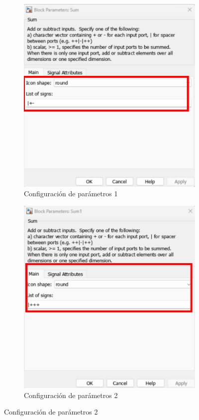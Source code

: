\begin{figure}[htbp]
\begin{subfigure}[b]{0.45\textwidth}
        \includegraphics[width=\textwidth]{fig/Capitulo5/Caso_de_estudio_PID/config_sum_02.pdf}
        \caption{Configuración de parámetros 1}
        \label{fig:parametros_add_01}
    \end{subfigure}
    \hfill
    \begin{subfigure}[b]{0.45\textwidth}
        \centering
        \includegraphics[width=\textwidth]{fig/Capitulo5/Caso_de_estudio_PID/config_sum_01.pdf}
        \caption{Configuración de parámetros 2}
        \label{fig:parametros_add_02}
    \end{subfigure}


\end{figure}
